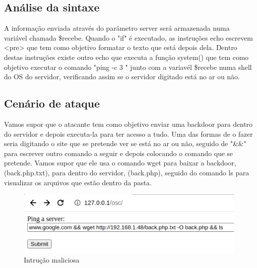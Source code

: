 \documentclass{report}
\begin{document}
\subsection{Análise da sintaxe}

A informação enviada através do parâmetro server será armazenada numa variável chamada \$recebe. Quando o "if" é executado, as instruções echo escrevem <pre> que tem como objetivo formatar o texto que está depois dela. Dentro destas instruções existe outro echo que executa a função system() que tem como objetivo executar o comando "ping -c 3 " junto com a variavél \$recebe numa shell do OS do servidor, verificando assim se o servidor digitado está no ar ou não.

\subsection{Cenário de ataque}

Vamos supor que o atacante tem como objetivo enviar uma backdoor para dentro do servidor e depois executa-la para ter acesso a tudo. Uma das formas de o fazer seria digitando o site que se pretende ver se está no ar ou não, seguido de "\&\&" para escrever outro comando a seguir e depois colocando o comando que se pretende. Vamos supor que ele usa o comando wget para baixar a backdoor, (back.php.txt), para dentro do servidor, (back.php), seguido do comando ls para visualizar os arquivos que estão dentro da pasta.
\begin{figure}[h]
 \centering
 \includegraphics[scale=0.3]{imagessql/Fig21.png}
 \caption{Intrução maliciosa}\label{instrução maliciosa}
\end{figure}
\end{document}

